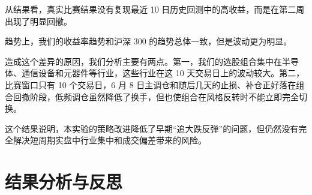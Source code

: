 \documentclass[fontset=mac]{ctexart}
\begin{document}
从结果看，真实比赛结果没有复现最近 10 日历史回测中的高收益，而是在第二周出现了明显回撤。

趋势上，我们的收益率趋势和沪深 300 的趋势总体一致，但是波动更为明显。

造成这个差异的原因，我们分析主要有两点。第一，我们的选股组合集中在半导体、通信设备和元器件等行业，这些行业在这 10 天交易日上的波动较大。第二，比赛窗口只有 10 个交易日，6 月 8 日主调仓和随后几天的止损、补仓正好落在组合回撤阶段，低频调仓虽然降低了换手，但也使组合在风格反转时不能立即完全切换。

这个结果说明，本实验的策略改进降低了早期“追大跌反弹”的问题，但仍然没有完全解决短周期实盘中行业集中和成交偏差带来的风险。


\section{结果分析与反思} \label{sec:analysis}




\end{document}
